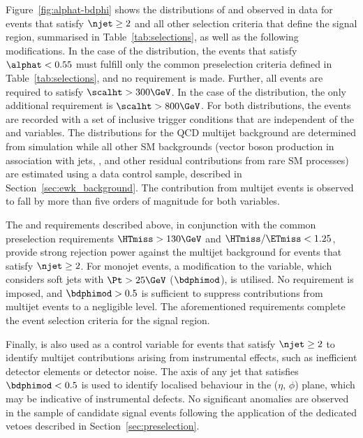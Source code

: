 Figure~\ref{fig:alphat-bdphi} shows the distributions of \alphat and
\bdphi observed in data for events that satisfy $\njet \geq 2$ and all
other selection criteria that define the signal region, summarised in
Table~\ref{tab:selections}, as well as the following modifications.
In the case of the \alphat distribution, the events that satisfy
$\alphat < 0.55$ must fulfill only the common preselection criteria
defined in Table~\ref{tab:selections}, and no \HTmiss requirement is
made. Further, all events are required to satisfy $\scalht >
300\GeV$. In the case of the \bdphi distribution, the only additional
requirement is $\scalht > 800\GeV$. For both distributions, the events
are recorded with a set of inclusive trigger conditions that are
independent of the \alphat and \bdphi variables. The distributions for
the QCD multijet background are determined from simulation while all
other SM backgrounds (vector boson production in association with
jets, \ttbar, and other residual contributions from rare SM processes)
are estimated using a \mj data control sample, described in
Section~\ref{sec:ewk_background}. The contribution from multijet
events is observed to fall by more than five orders of magnitude for
both variables.

The \alphat and \bdphi requirements described above, in conjunction
with the common preselection requirements $\HTmiss > 130\GeV$ and
$\HTmiss / \ETmiss < 1.25$, provide strong rejection power against the
multijet background for events that satisfy $\njet \geq 2$. For
monojet events, a modification to the \bdphi variable, which considers
soft jets with $\Pt > 25\GeV$ ($\bdphimod$), is utilised. No \alphat
requirement is imposed, and $\bdphimod > 0.5$ is sufficient to
suppress contributions from multijet events to a negligible level.
The aforementioned requirements complete the event selection criteria
for the signal region.

Finally, \bdphimod is also used as a control variable for events that
satisfy $\njet \geq 2$ to identify multijet contributions arising from
instrumental effects, such as inefficient detector elements or
detector noise. The axis of any jet that satisfies $\bdphimod < 0.5$
is used to identify localised behaviour in the ($\eta$, $\phi$) plane,
which may be indicative of instrumental defects. No significant
anomalies are observed in the sample of candidate signal events
following the application of the dedicated vetoes described in
Section~\ref{sec:preselection}.

